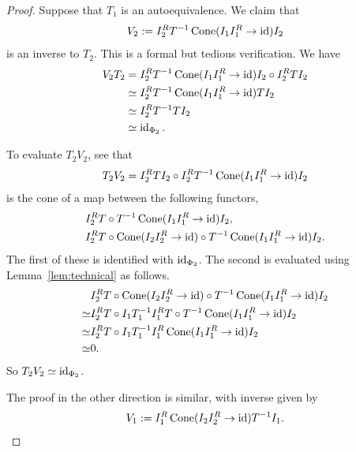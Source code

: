 \begin{proof}
    Suppose that $T_1$ is an autoequivalence. We claim that
    \[V_2 := I_2^RT^{-1}\operatorname{Cone}(I_1I_1^R\to \operatorname{id})I_2\]
    is an inverse to $T_2$. This is a formal but tedious verification. We have
    \begin{align*}
        V_2T_2 &= I_2^RT^{-1}\operatorname{Cone}(I_1I_1^R\to \operatorname{id})I_2\circ I_2^RTI_2\\
        &\simeq I_2^RT^{-1}\operatorname{Cone}(I_1I_1^R\to \operatorname{id})TI_2\\
        &\simeq I_2^RT^{-1}TI_2\\
        &\simeq \operatorname{id}_{\Phi_2}.
    \end{align*}
    
    To evaluate $T_2V_2$, see that
    \begin{align*}
        T_2V_2 = I_2^RTI_2\circ I_2^RT^{-1}\operatorname{Cone}(I_1I_1^R\to \operatorname{id})I_2
    \end{align*}
    is the cone of a map between the following functors,
    \begin{align*}
        &I_2^RT \circ T^{-1}\operatorname{Cone}(I_1I_1^R\to \operatorname{id})I_2,\\
        &I_2^RT \circ \operatorname{Cone}(I_2I_2^R\to \operatorname{id})\circ T^{-1}\operatorname{Cone}(I_1I_1^R\to \operatorname{id})I_2.
    \end{align*}
    The first of these is identified with $\operatorname{id}_{\Phi_2}$. The second is evaluated using Lemma~\ref{lem:technical} as follows.
    \begin{align*}
        &I_2^RT \circ\operatorname{Cone}(I_2I_2^R\to \operatorname{id})\circ T^{-1}\operatorname{Cone}(I_1I_1^R\to \operatorname{id})I_2\\
        \simeq&  I_2^RT \circ I_1T_1^{-1}I_1^RT\circ T^{-1}\operatorname{Cone}(I_1I_1^R\to \operatorname{id})I_2\\
        \simeq& I_2^RT \circ I_1T_1^{-1}I_1^R \operatorname{Cone}(I_1I_1^R\to \operatorname{id})I_2\\
        \simeq &0.
    \end{align*}
    So $T_2V_2\simeq \operatorname{id}_{\Phi_2}$.

    The proof in the other direction is similar, with inverse given by
    \[V_1 := I_1^R\operatorname{Cone}(I_2I_2^R\to \operatorname{id})T^{-1}I_1.\]
\end{proof}

